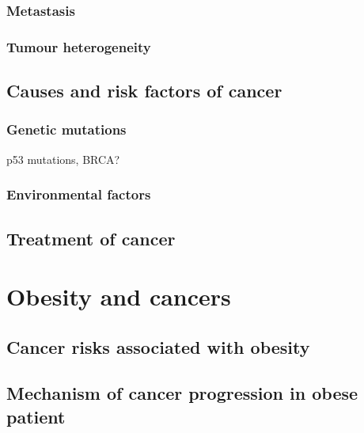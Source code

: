 \noindent



\subsubsection{Metastasis}
\label{ssub:metastasis}


\subsubsection{Tumour heterogeneity}
\label{subsub:tumour_heterogeneity}


\subsection{Causes and risk factors of cancer}
\label{sub:causes_and_risk_factors_of_cancer}

\subsubsection{Genetic mutations}
\label{ssub:Genetic mutations}

p53 mutations, BRCA?

\subsubsection{Environmental factors}
\label{ssub:Environmental factors}


\subsection{Treatment of cancer}
\label{sub:treatment_of_cancer}




\section{Obesity and cancers}
\label{sec:obesity_and_cancers}

\subsection{Cancer risks associated with obesity}
\label{sub:cancer_risks_associated_with_obesity}

\citep{Calle2003}

\subsection{Mechanism of cancer progression in obese patient}
\label{sub:mechanism_of_cancer_progression_in_obese_patient}



